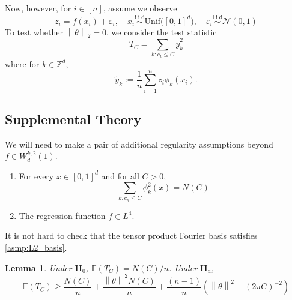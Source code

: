 \documentclass{article}
\newcommand{\norm}[1]{\left\lVert#1\right\rVert}
\newcommand{\1}{\mathbb{I}}
\newcommand{\Ebb}{\mathbb{E}}
\theoremstyle{alden}
\theoremstyle{aldenthm}
\newtheorem{lemma}{Lemma}
\theoremstyle{definition}
\theoremstyle{remark}
\begin{document}
Now, however, for $i \in [n]$, assume we observe
\begin{equation*}
z_i = f(x_i) + \varepsilon_i,\quad x_i \overset{\mathrm{i.i.d}}{\sim} \mathrm{Unif}\bigl([0,1]^d\bigr), \quad \varepsilon_i \overset{\mathrm{i.i.d}}{\sim} \mathcal{N}(0,1)
\end{equation*}
To test whether $\norm{\theta}_2 = 0$, we consider the test statistic
\begin{equation*}
T_C = \sum_{k: c_k \leq C} \widetilde{y}_k^2
\end{equation*}
where for $k \in \mathbb{Z}^d$,
\begin{equation*}
\widetilde{y}_k := \frac{1}{n} \sum_{i = 1}^{n} z_i \phi_k(x_i).
\end{equation*}

\subsection{Supplemental Theory}
We will need to make a pair of additional regularity assumptions beyond $f \in W^{k,2}_d(1)$. 
\begin{enumerate}[label = (A\arabic*)]
	\item 
	\label{asmp:L2_basis}
	For every $x \in [0,1]^d$ and for all $C > 0$,
	\begin{equation*}
	\sum_{k: c_k \leq C} \phi_k^2(x) = N(C)
	\end{equation*}
	\item 
	\label{asmp:L4_regression_function} The regression function $f \in L^4$.
\end{enumerate}
It is not hard to check that the tensor product Fourier basis satisfies \ref{asmp:L2_basis}.
\begin{lemma}
	Under $\mathbf{H}_0$, $\Ebb(T_C) = N(C)/n$. Under $\mathbf{H}_a$, 
	\begin{equation*}
	\Ebb(T_C) \geq \frac{N(C)}{n} + \frac{\norm{\theta}^2N(C)}{n} + \frac{(n-1)}{n}\left(\norm{\theta}^2 - (2\pi C)^{-2}\right)
	\end{equation*}
\end{lemma}
\end{document}
